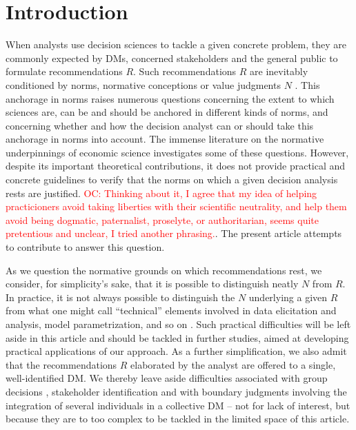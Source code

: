 \documentclass[preprint, french, english, 11pt, authoryear]{elsarticle}%
\newcommand{\commentOC}[1]{\textcolor{red}{OC: #1}}
\begin{document}
\section{Introduction}
When analysts use decision sciences to tackle a given concrete problem, they are commonly expected by \acp{DM}, concerned stakeholders and the general public to formulate recommendations $R$. 
Such recommendations $R$ are inevitably conditioned by norms, normative conceptions or value judgments $N$ \citep{funtowicz_science_1993,brans_ethics_2002,mingers_ethics_2011,ormerod_operational_2013,diekmann_moral_2013}. This anchorage in norms raises numerous questions concerning the extent to which sciences are, can be and should be anchored in different kinds of norms, and concerning whether and how the decision analyst can or should take this anchorage in norms into account. The immense literature on the normative underpinnings of economic science \citep{buchanan_positive_1959, sen_nature_1967, dwyer_scientific_1985, heath_value_1994, sen_rationality_2004, mongin_value_2006, sen_idea_2009, baujard_value_2013} investigates some of these questions. %
However, despite its important theoretical contributions, it does not provide practical and concrete guidelines to verify that the norms on which a given decision analysis rests are justified. \commentOC{Thinking about it, I agree that my idea of helping practicioners avoid taking liberties with their scientific neutrality, and help them avoid being dogmatic, paternalist, proselyte, or authoritarian, seems quite pretentious and unclear, I tried another phrasing.}.
The present article attempts to contribute to answer this question. 

As we question the normative grounds on which recommendations rest, we consider, for simplicity's sake, that it is possible to distinguish neatly $N$ from $R$. In practice, it is not always possible to distinguish the $N$ underlying a given $R$ from what one might call ``technical'' elements involved in data elicitation and analysis, model parametrization, and so on \citep{baujard_value_2013}. Such practical difficulties will be left aside in this article and should be tackled in further studies, aimed at developing practical applications of our approach. As a further simplification, we also admit that the recommendations $R$ elaborated by the analyst are offered to a single, well-identified \ac{DM}. We thereby leave aside difficulties associated with group decisions \citep{jackson_towards_1984}, stakeholder identification \citep{wang_systemic_2015} and with boundary judgments involving the integration of several individuals in a collective \ac{DM} \citep{midgley_systemic_2000} -- not for lack of interest, but because they are to too complex to be tackled in the limited space of this article.
\end{document}
